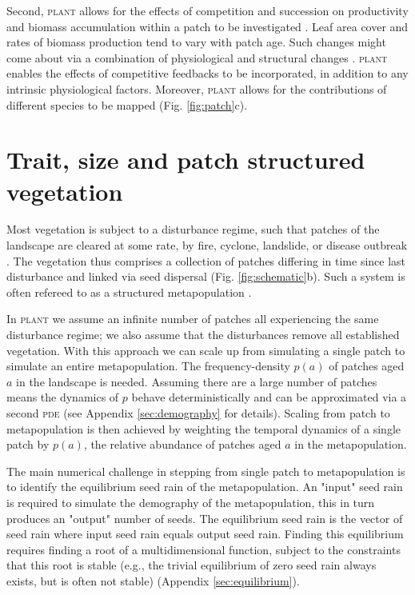 \documentclass[a4paper,11pt]{article}
\newcommand{\plant}{\textsc{plant}}
\begin{document}
Second, {\plant} allows for the effects of competition and succession on
productivity and biomass accumulation within a patch to be investigated
\citep{Falster-2011}. Leaf area cover and rates of biomass production
tend to vary with patch age. Such changes might come about via a
combination of physiological and structural changes
\citep{Binkley-2002, Smith-2001, Coomes-2007, Ogawa-2010}. {\plant} enables
the effects of competitive feedbacks to be incorporated, in addition to
any intrinsic physiological factors. Moreover, {\plant} allows for the
contributions of different species to be mapped (Fig. \ref{fig:patch}c).

\section{Trait, size and patch structured vegetation}

Most vegetation is subject to a disturbance regime, such that patches of
the landscape are cleared at some rate, by fire, cyclone, landslide, or
disease outbreak
\citep{White-1979, Bormann-1979, Chambers-2013}.
The vegetation thus comprises a collection of patches differing in time
since last disturbance and linked via seed dispersal (Fig.
\ref{fig:schematic}b). Such a system is often refereed to as a
structured metapopulation \citep{Gyllenberg-2001}.

In {\plant} we assume an infinite number of patches all experiencing
the same disturbance regime; we also assume that the disturbances remove
all established vegetation.  With this approach we can scale up from
simulating a single patch to simulate an entire metapopulation.
The frequency-density
\(p(a)\) of patches aged \(a\) in the landscape is needed. Assuming there
are a large number of patches means the dynamics of \(p\) behave
deterministically and can be approximated via a second \textsc{pde}
\citep{ Vonfoerster-1959} (see Appendix
\ref{sec:demography} for
details). Scaling from patch to metapopulation is then achieved by
weighting the temporal dynamics of a single patch by \(p(a)\), the
relative abundance of patches aged \(a\) in the metapopulation.

The main numerical challenge in stepping from single patch to
metapopulation is to identify the equilibrium seed rain of the
metapopulation. An "input" seed rain is required to simulate 
the demography of the metapopulation, this in turn produces an "output" 
number of seeds. The equilibrium seed rain is the vector of seed 
rain where input seed
rain equals output seed rain. Finding this equilibrium requires
finding a root of a multidimensional function, subject to the
constraints that this root is stable (e.g., the trivial equilibrium of
zero seed rain always exists, but is often not stable) (Appendix
\ref{sec:equilibrium}).
\end{document}

